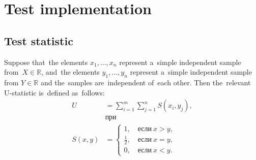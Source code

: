 \documentclass[russian,english]{scrreprt}
\begin{document}
\section{Test implementation}
\subsection{Test statistic}
Suppose that~the elements $x_{1},\ldots,x_{n}$ represent a~simple independent sample from~$X \in \mathbb{R}$, and~the elements $y_{1},\ldots, y_{n}$ represent a~simple independent sample from $Y \in \mathbb{R}$ and the~samples are~independent of~each other. Then the~relevant U-statistic is~defined as~follows:
\begin{equation}\label{eq:U-statistic-base-formula}
\begin{aligned}
U&=\sum_{i=1}^{m} \sum_{j=1}^{n} S (x_{i},y_{j}),\\
&\text{при}\\
S(x,y)&=
\begin{cases}
1,\quad \text{если}\ x>y,\\
\frac{1}{2},\quad \text{если}\ x=y,\\
0,\quad \text{если}\ x<y.
\end{cases}
\end{aligned}
\end{equation}
%
\end{document}
